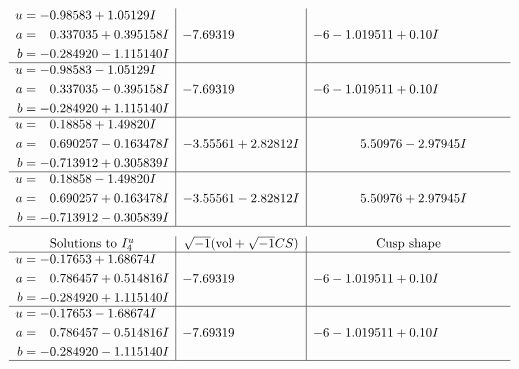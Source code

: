 \documentclass[1p]{elsarticle_modified}
\theoremstyle{definition}
\newcommand{\I}{\sqrt{-1}}
\begin{document}
$$\begin{array}{c|c|c}
\begin{aligned}
u &= -0.98583 + 1.05129 I \\
a &= \phantom{-}0.337035 + 0.395158 I \\
b &= -0.284920 - 1.115140 I\end{aligned}
 & -7.69319\phantom{ +0.000000I} &                  -6
-1.019511 + 0. 10   I\phantom{ +0.000000I} \\ \hline\begin{aligned}
u &= -0.98583 - 1.05129 I \\
a &= \phantom{-}0.337035 - 0.395158 I \\
b &= -0.284920 + 1.115140 I\end{aligned}
 & -7.69319\phantom{ +0.000000I} &                  -6
-1.019511 + 0. 10   I\phantom{ +0.000000I} \\ \hline\begin{aligned}
u &= \phantom{-}0.18858 + 1.49820 I \\
a &= \phantom{-}0.690257 - 0.163478 I \\
b &= -0.713912 + 0.305839 I\end{aligned}
 & -3.55561 + 2.82812 I & \phantom{-}5.50976 - 2.97945 I \\ \hline\begin{aligned}
u &= \phantom{-}0.18858 - 1.49820 I \\
a &= \phantom{-}0.690257 + 0.163478 I \\
b &= -0.713912 - 0.305839 I\end{aligned}
 & -3.55561 - 2.82812 I & \phantom{-}5.50976 + 2.97945 I\\
 \hline 
 \end{array}$$\newpage$$\begin{array}{c|c|c}  
\text{Solutions to }I^u_{4}& \I (\text{vol} + \sqrt{-1}CS) & \text{Cusp shape}\\
 \hline 
\begin{aligned}
u &= -0.17653 + 1.68674 I \\
a &= \phantom{-}0.786457 + 0.514816 I \\
b &= -0.284920 + 1.115140 I\end{aligned}
 & -7.69319\phantom{ +0.000000I} &                  -6
-1.019511 + 0. 10   I\phantom{ +0.000000I} \\ \hline\begin{aligned}
u &= -0.17653 - 1.68674 I \\
a &= \phantom{-}0.786457 - 0.514816 I \\
b &= -0.284920 - 1.115140 I\end{aligned}
 & -7.69319\phantom{ +0.000000I} &                  -6
-1.019511 + 0. 10   I\phantom{ +0.000000I}\\
 \hline 
 \end{array}$$\newpage\newpage\renewcommand{\arraystretch}{1}
\end{document}

